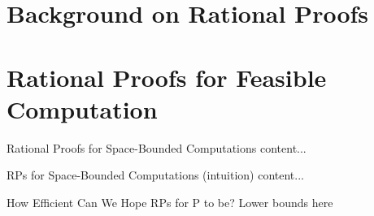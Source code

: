 \section{Background on Rational Proofs}


\section{Rational Proofs for Feasible Computation}

\begin{frame}{Rational Proofs for Space-Bounded Computations}
	content...
\end{frame}

\begin{frame}{RPs for Space-Bounded Computations (intuition)}
	content...
\end{frame}

\begin{frame}{How Efficient Can We Hope RPs for P to be?}
 Lower bounds here
\end{frame}

